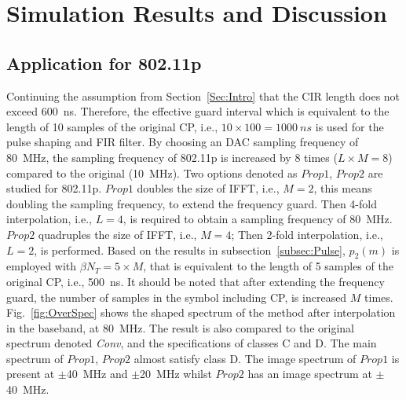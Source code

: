 \section{Simulation Results and Discussion}
\subsection{Application for 802.11p}
Continuing the assumption from Section~\ref{Sec:Intro} that the CIR length does not exceed 600~ns.
Therefore, the effective guard interval which is equivalent to the length of 10 samples of the original CP, i.e., $10 \times 100=1000~ns$ is used for the pulse shaping and FIR filter.
By choosing an DAC sampling frequency of 80~MHz, the sampling frequency of 802.11p is increased by 8 times ($L\times M =8$) compared to the original (10~MHz).
Two options denoted as $\mathit{Prop}1$, $\mathit{Prop}2$ are studied for 802.11p.
$\mathit{Prop}1$ doubles the size of IFFT, i.e., $M=2$, this means doubling the sampling frequency, to extend the frequency guard.
Then 4-fold interpolation, i.e., $L=4$, is required to obtain a sampling frequency of 80~MHz.
$\mathit{Prop}2$ quadruples the size of IFFT, i.e., $M=4$; Then 2-fold interpolation, i.e., $L=2$, is performed.
Based on the results in subsection~\ref{subsec:Pulse}, $p_2(m)$ is employed with $\beta N_{T}=5 \times M$, that is equivalent to the length of 5 samples of the original CP, i.e., 500~ns.
It should be noted that after extending the frequency guard, the number of samples in the symbol including CP, is increased $M$ times.
Fig.~\ref{fig:OverSpec} shows the shaped spectrum of the method after interpolation in the baseband, at 80~MHz.
The result is also compared to the original spectrum denoted \emph{Conv}, and the specifications of classes C and D.
The main spectrum of $\mathit{Prop}1$, $\mathit{Prop}2$ almost satisfy class D.
The image spectrum of $\mathit{Prop}1$ is present at $\pm$40~MHz and $\pm$20~MHz whilst $\mathit{Prop}2$ has an image spectrum at $\pm$40~MHz.

